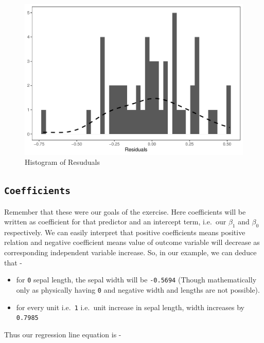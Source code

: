 \documentclass[
]{book}
\providecommand{\tightlist}{%
  \setlength{\itemsep}{0pt}\setlength{\parskip}{0pt}}
\begin{document}
\begin{figure}

{\centering \includegraphics{DauR_files/figure-latex/ex1hist-1} 

}

\caption{Histogram of Resuduals}\label{fig:ex1hist}
\end{figure}

\hypertarget{coefficients}{%
\subsection{\texorpdfstring{\texttt{Coefficients}}{Coefficients}}\label{coefficients}}

Remember that these were our goals of the exercise. Here coefficients will be written as coefficient for that predictor and an intercept term, i.e.~our \(\beta_1\) and \(\beta_0\) respectively. We can easily interpret that positive coefficients means positive relation and negative coefficient means value of outcome variable will decrease as corresponding independent variable increase. So, in our example, we can deduce that -

\begin{itemize}
\tightlist
\item
  for \texttt{0} sepal length, the sepal width will be \texttt{-0.5694} (Though mathematically only as physically having \texttt{0} and negative width and lengths are not possible).
\item
  for every unit i.e.~\texttt{1} i.e.~unit increase in sepal length, width increases by \texttt{0.7985}
\end{itemize}

Thus our regression line equation is -
\end{document}
